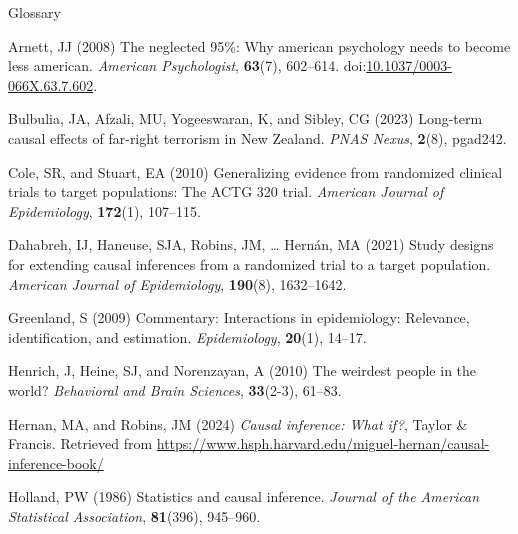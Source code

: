 \documentclass[
  single column]{article}
\newlength{\cslhangindent}
\newenvironment{CSLReferences}[2] %
 {\begin{list}{}{%
  \setlength{\itemindent}{0pt}
  \setlength{\leftmargin}{0pt}
  \setlength{\parsep}{0pt}
  \ifodd #1
   \setlength{\leftmargin}{\cslhangindent}
   \setlength{\itemindent}{-1\cslhangindent}
  \fi
  \setlength{\itemsep}{#2\baselineskip}}}
 {\end{list}}
\begin{document}
\begin{table}

\caption{\label{tbl-experiments}Glossary}

\centering{

\glossaryTerms

}

\end{table}%

\label{refs}
\begin{CSLReferences}{1}{0}
Arnett, JJ (2008) The neglected 95\%: Why american psychology needs to
become less american. \emph{American Psychologist}, \textbf{63}(7),
602--614.
doi:\href{https://doi.org/10.1037/0003-066X.63.7.602}{10.1037/0003-066X.63.7.602}.

Bulbulia, JA, Afzali, MU, Yogeeswaran, K, and Sibley, CG (2023)
Long-term causal effects of far-right terrorism in {N}ew {Z}ealand.
\emph{PNAS Nexus}, \textbf{2}(8), pgad242.

Cole, SR, and Stuart, EA (2010) Generalizing evidence from randomized
clinical trials to target populations: The ACTG 320 trial.
\emph{American Journal of Epidemiology}, \textbf{172}(1), 107--115.

Dahabreh, IJ, Haneuse, SJA, Robins, JM, \ldots{} Hernán, MA (2021) Study
designs for extending causal inferences from a randomized trial to a
target population. \emph{American Journal of Epidemiology},
\textbf{190}(8), 1632--1642.

Greenland, S (2009) Commentary: Interactions in epidemiology: Relevance,
identification, and estimation. \emph{Epidemiology}, \textbf{20}(1),
14--17.

Henrich, J, Heine, SJ, and Norenzayan, A (2010) The weirdest people in
the world? \emph{Behavioral and Brain Sciences}, \textbf{33}(2-3),
61--83.

Hernan, MA, and Robins, JM (2024) \emph{Causal inference: What if?},
Taylor \& Francis. Retrieved from
\url{https://www.hsph.harvard.edu/miguel-hernan/causal-inference-book/}

Holland, PW (1986) Statistics and causal inference. \emph{Journal of the
American Statistical Association}, \textbf{81}(396), 945--960.


\end{CSLReferences}
\end{document}
